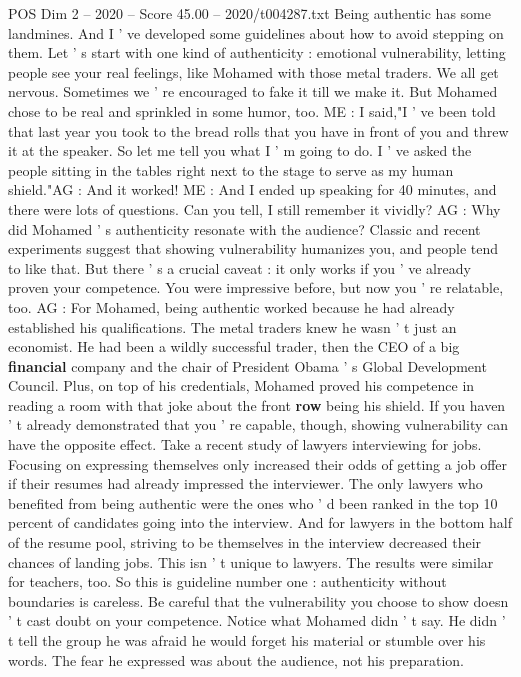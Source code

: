 \begin{textsample}{POS Dim 2 – 2020 – Score 45.00 – 2020/t004287.txt}
Being authentic has some landmines.
And I ' ve developed some guidelines about how to avoid stepping on them.
Let ' s start with one kind of authenticity : emotional vulnerability, letting people see your real feelings, like Mohamed with those metal traders.
We all get nervous.
Sometimes we ' re encouraged to fake it till we make it.
But Mohamed chose to be real and sprinkled in some humor, too.
ME : I said,"I ' ve been told that last year you took to the bread rolls that you have in front of you and threw it at the speaker.
So let me tell you what I ' m going to do.
I ' ve asked the people sitting in the tables right next to the stage to serve as my human shield."AG : And it worked!
ME : And I ended up speaking for 40 minutes, and there were lots of questions.
Can you tell, I still remember it vividly?
AG : Why did Mohamed ' s authenticity resonate with the audience?
Classic and recent experiments suggest that showing vulnerability humanizes you, and people tend to like that.
But there ' s a crucial caveat : it only works if you ' ve already proven your competence.
You were impressive before, but now you ' re relatable, too.
AG : For Mohamed, being authentic worked because he had already established his qualifications.
The metal traders knew he wasn ' t just an economist.
He had been a wildly successful trader, then the CEO of a big \textbf{financial} company and the chair of President Obama ' s Global Development Council.
Plus, on top of his credentials, Mohamed proved his competence in reading a room with that joke about the front \textbf{row} being his shield.
If you haven ' t already demonstrated that you ' re capable, though, showing vulnerability can have the opposite effect.
Take a recent study of lawyers interviewing for jobs.
Focusing on expressing themselves only increased their odds of getting a job offer if their resumes had already impressed the interviewer.
The only lawyers who benefited from being authentic were the ones who ' d been ranked in the top 10 percent of candidates going into the interview.
And for lawyers in the bottom half of the resume pool, striving to be themselves in the interview decreased their chances of landing jobs.
This isn ' t unique to lawyers.
The results were similar for teachers, too.
So this is guideline number one : authenticity without boundaries is careless.
Be careful that the vulnerability you choose to show doesn ' t cast doubt on your competence.
Notice what Mohamed didn ' t say.
He didn ' t tell the group he was afraid he would forget his material or stumble over his words.
The fear he expressed was about the audience, not his preparation.

\end{textsample}

